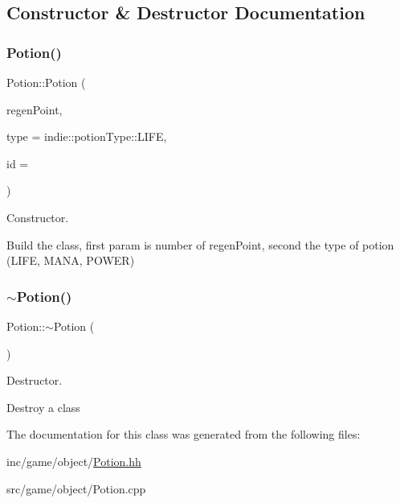 \subsection{Constructor \& Destructor Documentation}
\mbox{\label{classPotion_ae01585e2601f88d03debb1a675d5bc06}} 
\subsubsection{\texorpdfstring{Potion()}{Potion()}}
{\footnotesize\ttfamily Potion\+::\+Potion (\begin{DoxyParamCaption}\item[{Int}]{regen\+Point,  }\item[{indie\+::potion\+Type}]{type = {\ttfamily indie\+:\+:potionType\+:\+:LIFE},  }\item[{Unsigned\+Int}]{id = {} }\end{DoxyParamCaption})}



Constructor. 

Build the class, first param is number of regen\+Point, second the type of potion (L\+I\+FE, M\+A\+NA, P\+O\+W\+ER) \mbox{\label{classPotion_a8730c8052ec698171885bb5dacda9cca}} 
\subsubsection{\texorpdfstring{$\sim$\+Potion()}{~Potion()}}
{\footnotesize\ttfamily Potion\+::$\sim$\+Potion (\begin{DoxyParamCaption}{ }\end{DoxyParamCaption})}



Destructor. 

Destroy a class 

The documentation for this class was generated from the following files\+:\begin{DoxyCompactItemize}
\item 
inc/game/object/\hyperlink{Potion_8hh}{Potion.\+hh}\item 
src/game/object/Potion.\+cpp\end{DoxyCompactItemize}
